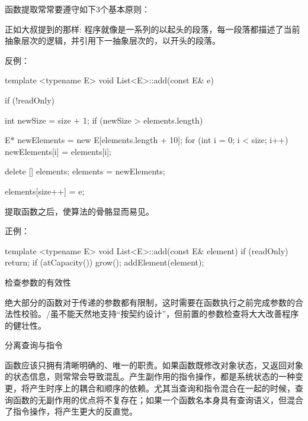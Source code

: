 \begin{content}
函数提取常常要遵守如下3个基本原则：
\begin{enum}
\end{enum}

正如大叔提到的那样: 程序就像是一系列的以起头的段落，每一段落都描述了当前抽象层次的逻辑，并引用下一抽象层次的，以开头的段落。

反例：
\begin{leftbar}
\begin{c++}[caption={\ttfamily{cub/container/List.h}}]
template <typename E>
void List<E>::add(const E& e) 
{
    if (!readOnly) 
    {
        int newSize = size + 1;
        if (newSize > elements.length) 
        {
            E* newElements = new E[elements.length + 10];
            for (int i = 0; i < size; i++)
                newElements[i] = elements[i];

            delete [] elements;
            elements = newElements;
        }
        elements[size++] = e;
    }
}
\end{c++}
\end{leftbar}

提取函数之后，使算法的骨骼显而易见。

正例：
\begin{leftbar}
\begin{c++}[caption={\ttfamily{cub/container/List.h}}]
template <typename E>
void List<E>::add(const E& element) 
{
    if (readOnly)
        return;
    if (atCapacity())
        grow();
    addElement(element);
}
\end{c++}
\end{leftbar}

\begin{regulation}
检查参数的有效性
\end{regulation}

绝大部分的函数对于传递的参数都有限制，这时需要在函数执行之前完成参数的合法性校验。\clang{}/\cpp{}虽不能天然地支持“按契约设计”，但前置的参数检查将大大改善程序的健壮性。

\begin{regulation}
分离查询与指令
\end{regulation}

函数应该只拥有清晰明确的、唯一的职责。如果函数既修改对象状态，又返回对象的状态信息，则常常会导致混乱。产生副作用的指令操作，都是系统状态的一种变更，将产生时序上的耦合和顺序的依赖。尤其当查询和指令混合在一起的时候，查询函数的无副作用的优点将不复存在；如果一个函数名本身具有查询语义，但混合了指令操作，将产生更大的反直觉。


\end{content}
